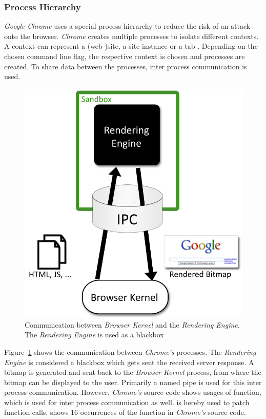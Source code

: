 \subsubsection{Process Hierarchy}
\emph{Google Chrome} uses a special process hierarchy to reduce the risk of an attack onto the browser. \emph{Chrome} creates multiple processes to isolate different contexts. A context can represent a (web-)site, a site instance or a tab \cite{chromium_process_models}. Depending on the chosen command line flag, the respective context is chosen and processes are created. To share data between the processes, inter process communication is used.
\begin{figure}[h]
\centering
\includegraphics[scale=0.5]{sections/background/chrome/communication.png}
\caption{Communication between \emph{Browser Kernel} and the \emph{Rendering Engine}. The \emph{Rendering Engine} is used as a blackbox \cite{chromium_security_architecture}}
\label{fig:chrome_communication}
\end{figure}
Figure~\ref{fig:chrome_communication} shows the communication between \emph{Chrome's} processes. The \emph{Rendering Engine} is considered a blackbox which gets sent the received server response. A bitmap is generated and sent back to the \emph{Browser Kernel} process, from where the bitmap can be displayed to the user. Primarily a named pipe \cite{chromium_security_architecture} is used for this inter process communication. However, \emph{Chrome's} source code shows usages of  function, which is used for inter process communication as well.  is hereby used to patch function calls. \cite{chromium_source_writeprocessmemory} shows 16 occurrences of the  function in \emph{Chrome's} source code.
